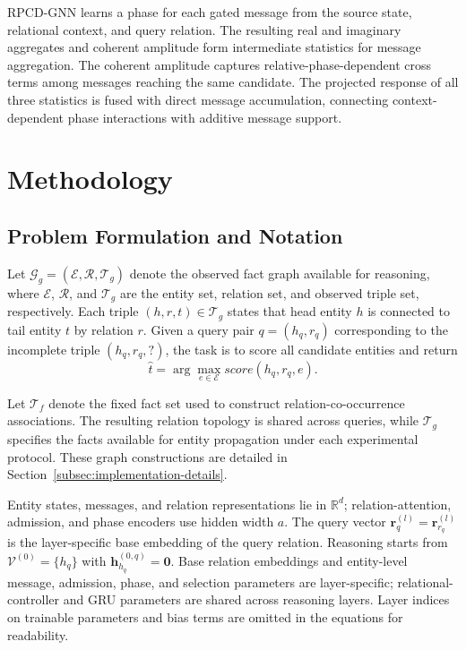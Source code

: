 \documentclass[a4paper,fleqn]{cas-dc}
\begin{document}
RPCD-GNN learns a phase for each gated message from the source state, relational context, and query relation. The resulting real and imaginary aggregates and coherent amplitude form intermediate statistics for message aggregation. The coherent amplitude captures relative-phase-dependent cross terms among messages reaching the same candidate. The projected response of all three statistics is fused with direct message accumulation, connecting context-dependent phase interactions with additive message support.

\section{Methodology}\label{sec:methodology}

\subsection{Problem Formulation and Notation}\label{subsec:problem-formulation}

Let $\mathcal{G}_{g}=(\mathcal{E},\mathcal{R},\mathcal{T}_{g})$ denote the observed fact graph available for reasoning, where $\mathcal{E}$, $\mathcal{R}$, and $\mathcal{T}_{g}$ are the entity set, relation set, and observed triple set, respectively. Each triple $(h,r,t)\in\mathcal{T}_{g}$ states that head entity $h$ is connected to tail entity $t$ by relation $r$. Given a query pair $q=(h_q,r_q)$ corresponding to the incomplete triple $(h_q,r_q,?)$, the task is to score all candidate entities and return
\begin{equation}
\hat{t}
=
\arg\max_{e\in\mathcal{E}}
score(h_q,r_q,e).
\label{eq:reasoning-task}
\end{equation}

Let $\mathcal{T}_{f}$ denote the fixed fact set used to construct relation-co-occurrence associations. The resulting relation topology is shared across queries, while $\mathcal{T}_{g}$ specifies the facts available for entity propagation under each experimental protocol. These graph constructions are detailed in Section~\ref{subsec:implementation-details}.

Entity states, messages, and relation representations lie in $\mathbb{R}^{d}$; relation-attention, admission, and phase encoders use hidden width $a$. The query vector $\mathbf{r}_{q}^{(l)}=\mathbf{r}_{r_q}^{(l)}$ is the layer-specific base embedding of the query relation. Reasoning starts from $\mathcal{V}^{(0)}=\{h_q\}$ with $\mathbf{h}_{h_q}^{(0,q)}=\mathbf{0}$. Base relation embeddings and entity-level message, admission, phase, and selection parameters are layer-specific; relational-controller and GRU parameters are shared across reasoning layers. Layer indices on trainable parameters and bias terms are omitted in the equations for readability.
\end{document}

